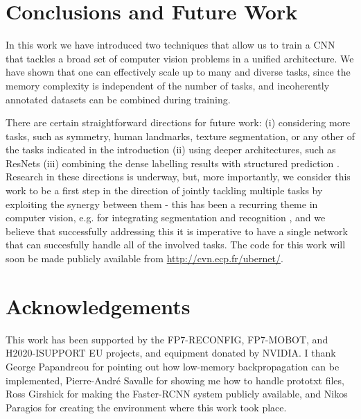 \documentclass[10pt,twocolumn,letterpaper]{article}
\begin{document}
	

	

\section{Conclusions and Future Work}
In this work we have introduced two techniques that allow us to train a  CNN that tackles a broad set of computer vision problems in a unified architecture. We have shown that one can effectively scale up to  many and diverse tasks, since 
the memory complexity is independent of the number of tasks, and incoherently annotated datasets can be combined during training.



There are certain straightforward directions for future work: (i) considering more tasks, such as symmetry, human landmarks, texture segmentation, or any other of the tasks indicated in the introduction (ii) using deeper architectures, such as ResNets \cite{HeZRS15} (iii) combining the dense labelling results with structured prediction
\cite{Adelaide,ChenPK0Y16,crfrnn,ChandraK16}. Research in these directions is underway, but, more importantly, we consider this work to be a first step in the direction of jointly tackling multiple tasks by exploiting the synergy between them - this has been a recurring theme in computer vision, e.g.  for integrating segmentation and recognition \cite{Keeler90,mumf94b,BottouBL97,TCYZ03,KoMa05,KTZ05,MaireYP11}, and we believe that successfully addressing this it is imperative to have a single network that can succesfully handle all of the involved tasks. 
The code for this work will soon be made publicly available from \url{http://cvn.ecp.fr/ubernet/}.


\section{Acknowledgements}
This work has been supported by the FP7-RECONFIG, FP7-MOBOT, and H2020-ISUPPORT EU projects, and equipment donated by NVIDIA. 
I thank George Papandreou for pointing out how  low-memory backpropagation can be implemented,  Pierre-Andr\'e Savalle for showing me how to handle prototxt files, Ross Girshick for making the Faster-RCNN system  publicly available, and Nikos Paragios for creating the environment where this work took place.
\end{document}
